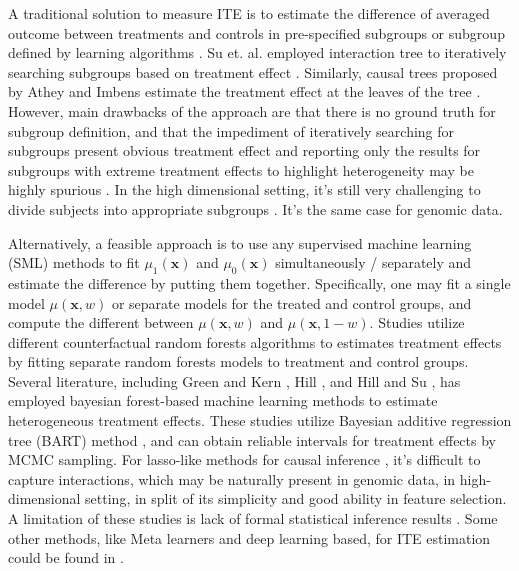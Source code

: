     A traditional solution to measure ITE is to estimate the difference of averaged outcome between treatments and controls in pre-specified subgroups \cite{gail1985testing} or subgroup defined by learning algorithms \cite{su2009subgroup, su2011interaction, athey2016recursive,foster2011subgroup}. Su et. al. employed interaction tree to iteratively searching subgroups based on treatment effect \cite{su2009subgroup,su2011interaction}. Similarly, causal trees proposed by Athey and Imbens estimate the treatment effect at the leaves of the tree \cite{athey2016recursive}. However, main drawbacks of the approach are that there is no ground truth for subgroup definition, and that the impediment of iteratively searching for subgroups present obvious treatment effect and reporting only the results for subgroups with extreme treatment effects to highlight heterogeneity may be highly spurious \cite{assmann2000subgroup,cook2004subgroup}. In the high dimensional setting, it's still very challenging to divide subjects into appropriate subgroups \cite{powers2017some}. It's the same case for genomic data. 
    
    Alternatively, a feasible approach is to use any supervised machine learning (SML) methods to fit $\mu_1(\mathbf{x})$ and $\mu_0(\mathbf{x})$ simultaneously / separately and estimate the difference by putting them together. Specifically, one may fit a single model $\mu(\mathbf{x},w)$ or separate models for the treated and control groups, and compute the different between $\mu(\mathbf{x},w)$ and $\mu(\mathbf{x}, 1-w)$. Studies \cite{lu2018estimating,dasgupta2014risk} utilize different counterfactual random forests algorithms to estimates treatment effects by fitting separate random forests models to treatment and control groups. Several literature, including Green and Kern \cite{green2012modeling}, Hill \cite{hill2011bayesian}, and Hill and Su \cite{hill2013assessing}, has employed bayesian forest-based machine learning methods to estimate heterogeneous treatment effects. These studies utilize Bayesian additive regression tree (BART) method \cite{chipman2010bart}, and can obtain reliable intervals for treatment effects by MCMC sampling. For lasso-like methods for causal inference \cite{imai2013estimating,tian2014simple}, it's difficult to capture interactions, which may be naturally present in genomic data, in high-dimensional setting, in split of its simplicity and good ability in feature selection. A limitation of these studies is lack of formal statistical inference results \cite{wager2018estimation}. Some other methods, like Meta learners and deep learning based, for ITE estimation could be found in \cite{kunzel2019metalearners, johansson2016learning}.
    
